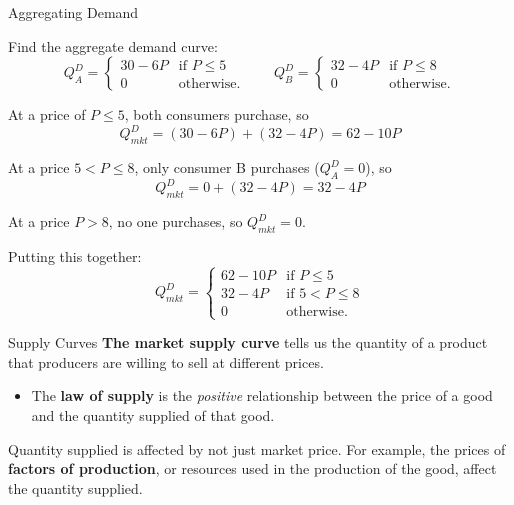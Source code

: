 \documentclass[12pt,t]{beamer}
\begin{document}
\begin{frame}{Aggregating Demand}

  \bigskip
  Find the aggregate demand curve:
  $$
    Q_A^D =
    \begin{cases}
      30 - 6P & \text{if } P \leq 5 \\
      0       & \text{otherwise}.
    \end{cases}
    \quad\quad
    Q_B^D =
    \begin{cases}
      32 - 4P & \text{if } P  \leq 8 \\
      0       & \text{otherwise}.
    \end{cases}
  $$
\end{frame}

\begin{frame}[shrink]

  \bigskip
  At a price of $P \leq 5$, both consumers purchase, so
  $$Q_{mkt}^D = (30 - 6P) + (32 - 4P) = 62 - 10P$$

  \medskip
  At a price $5 < P \leq 8$, only consumer B purchases ($Q_A^D = 0$), so
  $$Q_{mkt}^D = 0 + (32 - 4P) = 32 - 4P$$

  \medskip
  At a price $P > 8$, no one purchases, so $Q_{mkt}^D = 0$.

  \bigskip
  Putting this together:
  $$
    Q_{mkt}^D =
    \begin{cases}
      62 - 10P & \text{if } P \leq 5      \\
      32 - 4P  & \text{if } 5 < P \leq 8  \\
      0        & \text{otherwise}.
    \end{cases}
  $$
\end{frame}

\begin{frame}{Supply Curves}
  \textbf{The market supply curve} tells us the quantity of a product that producers are willing to sell at different prices.

  \begin{itemize}
    \item The \textbf{law of supply} is the \emph{positive} relationship between the price of a good and the quantity supplied of that good.
  \end{itemize}

  \bigskip
  Quantity supplied is affected by not just market price. For example, the prices of \textbf{factors of production}, or resources used in the production of the good, affect the quantity supplied.
\end{frame}
\end{document}
